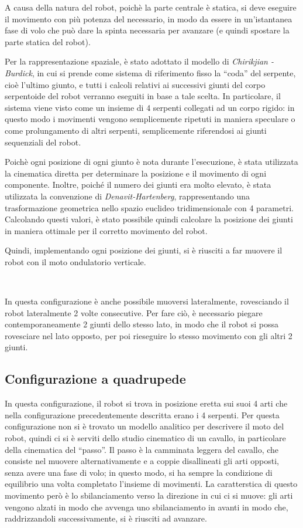 \documentclass[a4paper,titlepage]{book}
\begin{document}
A causa della natura del robot, poichè la parte centrale è statica, si deve eseguire il movimento con più potenza del necessario, in modo da essere in un'istantanea fase di volo che può dare la spinta necessaria per avanzare (e quindi spostare la parte statica del robot).

Per la rappresentazione spaziale, è stato adottato il modello di \textit{Chirikjian - Burdick}\cite{serpe1}, in cui si prende come sistema di riferimento fisso la ``coda'' del serpente, cioè l’ultimo giunto, e tutti i calcoli relativi ai successivi giunti del corpo serpentoide del robot verranno eseguiti in base a tale scelta. In particolare, il sistema viene visto come un insieme di 4 serpenti collegati ad un corpo rigido:
in questo modo i movimenti vengono semplicemente ripetuti in maniera speculare o come prolungamento di altri serpenti, semplicemente riferendosi ai giunti sequenziali del robot.

Poichè ogni posizione di ogni giunto è nota durante l'esecuzione, è stata utilizzata la cinematica diretta per determinare la posizione e il movimento di ogni componente. Inoltre, poiché il numero dei giunti era molto elevato, è stata utilizzata la convenzione di \textit{Denavit-Hartenberg}\cite{serpe2}, rappresentando una trasformazione geometrica nello spazio euclideo tridimensionale con 4 parametri.
Calcolando questi valori, è stato possibile quindi calcolare la posizione dei giunti in maniera ottimale per il corretto movimento del robot.

Quindi, implementando ogni posizione dei giunti, si è riusciti a far muovere il robot con il moto ondulatorio verticale.

~

In questa configurazione è anche possibile muoversi lateralmente, rovesciando il robot lateralmente 2 volte consecutive. Per fare ciò, è necessario piegare contemporaneamente 2 giunti dello stesso lato, in modo che il robot si possa rovesciare nel lato opposto, per poi rieseguire lo stesso movimento con gli altri 2 giunti.

\subsection{Configurazione a quadrupede}

In questa configurazione, il robot si trova in posizione eretta sui suoi 4 arti che nella configurazione precedentemente descritta erano i 4 serpenti. Per questa configurazione non si è trovato un modello analitico per descrivere il moto del robot, quindi ci si è serviti dello studio cinematico di un cavallo, in particolare della cinematica del ``passo''.
Il passo è la camminata leggera del cavallo, che consiste nel muovere alternativamente e a coppie disallineati gli arti opposti, senza avere una fase di volo; in questo modo, si ha sempre la condizione di equilibrio una volta completato l'insieme di movimenti. La caratterstica di questo movimento però è lo sbilanciamento verso la direzione in cui ci si muove: gli arti vengono alzati in modo che avvenga uno sbilanciamento in avanti in modo che, raddrizzandoli successivamente, si è riusciti ad avanzare.
\end{document}
